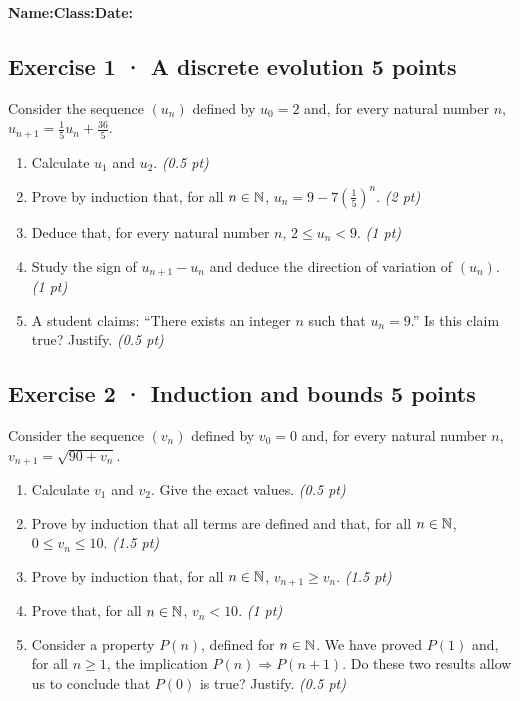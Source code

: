 \smallskip\textbf{Name:}\enspace\dotfill\quad\textbf{Class:}\enspace\dotfill\quad\textbf{Date:}\enspace\dotfill

\subsection*{Exercise 1 · A discrete evolution \hfill 5 points}Consider the sequence $(u_n)$ defined by $u_0=2$ and, for every natural number $n$, $u_{n+1}=\frac{1}{5}u_n+\frac{36}{5}$.

\begin{enumerate}

\item Calculate $u_1$ and $u_2$. \hfill\textit{(0.5 pt)}

\item Prove by induction that, for all $n\in\mathbb N$, $u_n=9-7\left(\frac{1}{5}\right)^n$. \hfill\textit{(2 pt)}

\item Deduce that, for every natural number $n$, $2\le u_n<9$. \hfill\textit{(1 pt)}

\item Study the sign of $u_{n+1}-u_n$ and deduce the direction of variation of $(u_n)$. \hfill\textit{(1 pt)}

\item A student claims: ``There exists an integer $n$ such that $u_n=9$.'' Is this claim true? Justify. \hfill\textit{(0.5 pt)}

\end{enumerate}

\subsection*{Exercise 2 · Induction and bounds \hfill 5 points}Consider the sequence $(v_n)$ defined by $v_0=0$ and, for every natural number $n$, $v_{n+1}=\sqrt{90+v_n}$.

\begin{enumerate}

\item Calculate $v_1$ and $v_2$. Give the exact values. \hfill\textit{(0.5 pt)}

\item Prove by induction that all terms are defined and that, for all $n\in\mathbb N$, $0\le v_n\le10$. \hfill\textit{(1.5 pt)}

\item Prove by induction that, for all $n\in\mathbb N$, $v_{n+1}\ge v_n$. \hfill\textit{(1.5 pt)}

\item Prove that, for all $n\in\mathbb N$, $v_n<10$. \hfill\textit{(1 pt)}

\item Consider a property $P(n)$, defined for $n\in\mathbb N$. We have proved $P(1)$ and, for all $n\ge1$, the implication $P(n)\Rightarrow P(n+1)$. Do these two results allow us to conclude that $P(0)$ is true? Justify. \hfill\textit{(0.5 pt)}

\end{enumerate}

